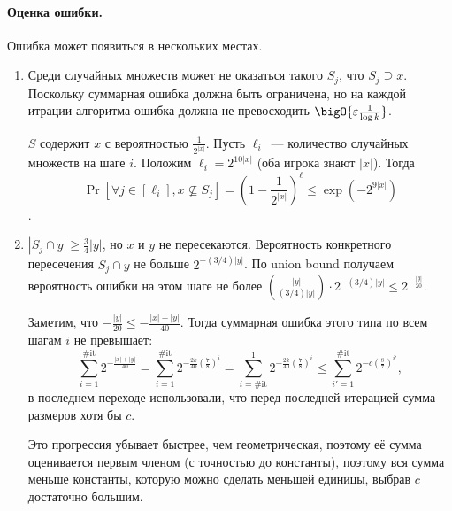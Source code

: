 \paragraph{Оценка ошибки.} Ошибка может появиться в нескольких местах.
\begin{enumerate}
    \item Среди случайных множеств может не оказаться такого $S_j$, что $S_j \supseteq x$. Поскольку
        суммарная ошибка должна быть ограничена, но на каждой итрации алгоритма ошибка должна не
        превосходить $\bigO{\varepsilon \frac{1}{\log k}}$.

        $S$ содержит $x$ с вероятностью $\frac{1}{2^{|x|}}$. Пусть $\ell_i$~--- количество случайных
        множеств на шаге $i$. Положим $\ell_i = 2^{10|x|}$ (оба игрока знают $|x|$). Тогда
        $$
            \Pr[\forall j \in [\ell_i],  x \nsubseteq S_j] = (1 - \frac{1}{2^{|x|}})^{\ell} \le
            \exp\left(-2^{9|x|}\right)
        $$.
    \item $|S_j \cap y| \ge \frac{3}{4}|y|$, но $x$ и $y$ не пересекаются. Вероятность конкретного
        пересечения $S_j \cap y$ не больше $2^{-(3/4)|y|}$. По union bound получаем вероятность ошибки на
        этом шаге не более $\binom{|y|}{(3 / 4)|y|}\cdot 2^{-(3 / 4)|y|} \le 2^{-\frac{|y|}{20}}$.

        Заметим, что $-\frac{|y|}{20} \le -\frac{|x| + |y|}{40}$. Тогда суммарная ошибка этого типа по
        всем шагам $i$ не превышает:
        $$
            \sum_{i = 1}^{\#\text{it}} 2^{-\frac{|x| + |y|}{40}} = \sum_{i = 1}^{\#\text{it}}
            2^{-\frac{2k}{40} \left(\frac{7}{8}\right)^i} = \sum_{i = \#\text{it}}^{1}
            2^{-\frac{2k}{40}\left(\frac{7}{8}\right)^i} \le \sum_{i' = 1}^{\#\text{it}}
            2^{-c\left(\frac{8}{7}\right)^{i'}}, 
        $$
        в последнем переходе использовали, что перед последней итерацией сумма размеров хотя бы $c$.

        Это прогрессия убывает быстрее, чем геометрическая, поэтому её сумма оценивается первым членом (с
        точностью до константы), поэтому вся сумма меньше константы, которую можно сделать меньшей
        единицы, выбрав $c$ достаточно большим.
\end{enumerate}



